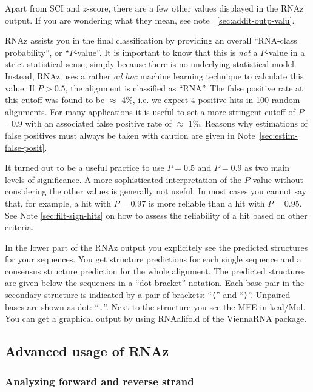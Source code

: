 \documentclass[11pt]{article}
\begin{document}
Apart from SCI and $z$-score, there are a few other values displayed in the
RNAz output. If you are wondering what they mean, see note
~\ref{sec:addit-outp-valu}.

RNAz assists you in the final classification by providing an overall
``RNA-class probability'', or ``$P$-value''. It is important to know that
this is \emph{not} a $P$-value in a strict statistical sense, simply
because there is no underlying statistical model. Instead, RNAz uses a
rather \emph{ad hoc} machine learning technique to calculate this value.
If $P>$0.5, the alignment is classified as ``RNA''.  The false positive
rate at this cutoff was found to be $\approx$ 4\%, i.e. we expect 4
positive hits in 100 random alignments. For many applications it is useful
to set a more stringent cutoff of $P$=0.9 with an associated false positive
rate of $\approx$ 1\%. Reasons why estimations of false positives must
always be taken with caution are given in Note~\ref{sec:estim-false-posit}.

It turned out to be a useful practice to use $P=$0.5 and $P=$0.9 as two
main levels of significance. A more sophisticated interpretation of the
$P$-value without considering the other values is generally not useful. In
most cases you cannot say that, for example, a hit with $P=$0.97 is more
reliable than a hit with $P=$0.95. See Note \ref{sec:filt-sign-hits} on how
to assess the reliability of a hit based on other criteria.

In the lower part of the RNAz output you explicitely see the predicted
structures for your sequences. You get structure predictions for each
single sequence and a consensus structure prediction for the whole
alignment. The predicted structures are given below the sequences in a
``dot-bracket'' notation. Each base-pair in the secondary structure is
indicated by a pair of brackets: ``\texttt{(}'' and ``\texttt{)}''.
Unpaired bases are shown as dot: ``\texttt{.}''. Next to the structure you
see the MFE in kcal/Mol. You can get a graphical output by using RNAalifold
of the ViennaRNA package.

\subsection{Advanced usage of RNAz}

\subsubsection{Analyzing forward and reverse strand}
\end{document}
